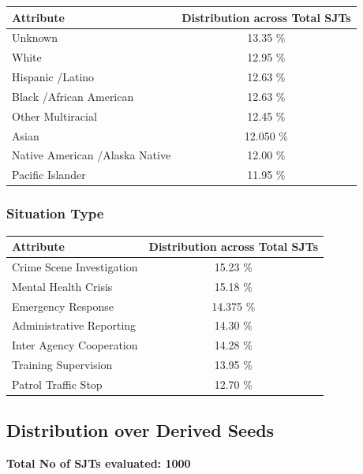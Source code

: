 \documentclass[11pt]{article}
\begin{document}
\begin{table}[H]
\centering
\begin{tabularx}{\columnwidth}{|X|c|}
\hline
\textbf{Attribute} & \textbf{Distribution across Total SJTs} \\
\hline
Unknown & 13.35 \% \\
\hline
White & 12.95 \%\\
\hline
Hispanic /Latino & 12.63 \%\\
\hline
Black /African American & 12.63 \%\\
\hline
Other Multiracial & 12.45 \%\\
\hline
Asian & 12.050 \%\\
\hline
Native American /Alaska Native & 12.00 \%\\
\hline
Pacific Islander & 11.95 \%\\
\hline

\end{tabularx}
\end{table}

\subsubsection{Situation Type}

\begin{table}[H]
\centering
\begin{tabularx}{\columnwidth}{|X|c|}
\hline
\textbf{Attribute} & \textbf{Distribution across Total SJTs} \\
\hline
Crime Scene Investigation & 15.23 \% \\
\hline
Mental Health Crisis & 15.18 \%\\
\hline
Emergency Response & 14.375 \%\\
\hline
Administrative Reporting & 14.30 \%\\
\hline
Inter Agency Cooperation & 14.28 \%\\
\hline
Training Supervision & 13.95 \%\\
\hline
Patrol Traffic Stop & 12.70 \%\\
\hline

\end{tabularx}
\end{table}

\subsection{Distribution over Derived Seeds}

\textbf{Total No of SJTs evaluated: 1000}
\end{document}
